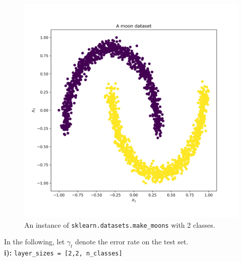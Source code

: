 \documentclass[12pt]{article}
\begin{document}
\begin{figure}[hbtp]
\begin{center}
\includegraphics[scale=0.38]{pics/exampleset.png}
\caption{An instance of \texttt{sklearn.datasets.make\_moons} with 2 classes.}
\label{fig:exset}
\end{center}
\end{figure}
\noindent In the following, let $\gamma_t$ denote the error rate on the test set.\\
\newpage
\textbf{i):} \texttt{layer\_sizes = [2,2, n\_classes]} \\
\end{document}
